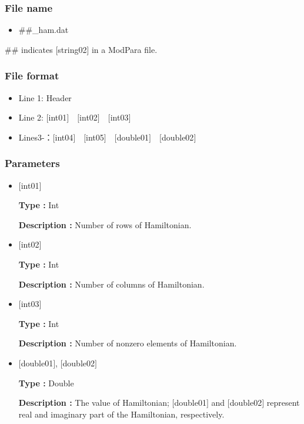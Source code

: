 \subsubsection{File name}
 \begin{itemize}
 \item \#\#\_ham.dat
 \end{itemize}
  \#\# indicates [string02] in a ModPara file.
  
\subsubsection{File format}
 \begin{itemize}
   \item Line 1: Header
   \item Line 2: $[$int01$]$~~$[$int02$]$~~$[$int03$]$
   \item Lines3-：$[$int04$]$~~$[$int05$]$~~$[$double01$]$~~$[$double02$]$
  \end{itemize}
  
  \subsubsection{Parameters}
 \begin{itemize}

  \item  $[$int01$]$

 {\bf Type :} Int

{\bf Description :} Number of rows of Hamiltonian.
 
  \item  $[$int02$]$

 {\bf Type :} Int 

{\bf Description :} Number of columns of Hamiltonian.

  \item  $[$int03$]$

 {\bf Type :} Int

{\bf Description :} Number of nonzero elements of Hamiltonian.

  \item  $[$double01$]$, $[$double02$]$

 {\bf Type :} Double

{\bf Description :} The value of Hamiltonian;  $[$double01$]$ and $[$double02$]$  represent real and imaginary part of the Hamiltonian, respectively.

\end{itemize}


